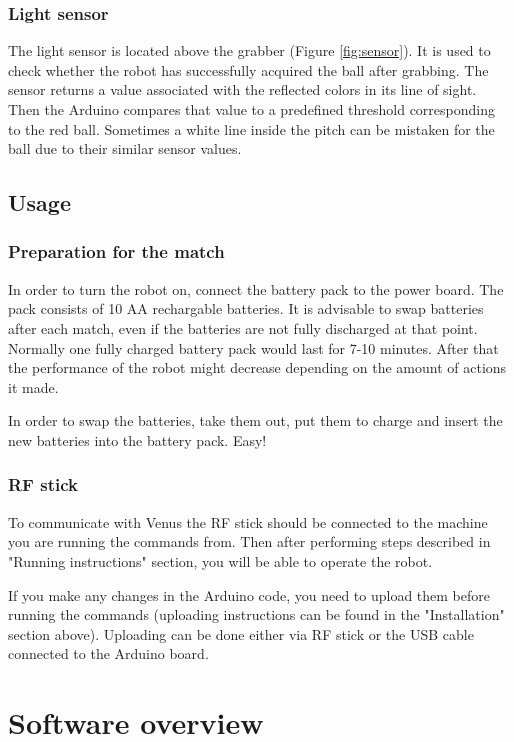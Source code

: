 \documentclass[a4paper,12pt]{article}
\begin{document}
\subsubsection{Light sensor}

The light sensor is located above the grabber (Figure \ref{fig:sensor}). It is used to check whether
the robot has successfully acquired the ball after grabbing. The sensor
returns a value associated with the reflected colors in its line of sight. Then the Arduino compares that value to a predefined threshold corresponding to the red ball. Sometimes a white
line inside the pitch can be mistaken for the ball due to their similar sensor
values.

\subsection{Usage}

\subsubsection{Preparation for the match}

In order to turn the robot on, connect the battery pack to the power board. The pack consists of 10 AA rechargable batteries. It is advisable to swap batteries after each match, even if the batteries are not fully discharged at that point. Normally one fully charged battery pack would last for 7-10 minutes. After that the performance of the robot might decrease depending on the amount of actions it made. 

In order to swap the batteries, take them out, put them to charge and insert the new batteries into the battery pack. Easy!

\subsubsection{RF stick}
To communicate with Venus the RF stick should be connected to the machine you are running the commands from. Then after performing steps described in "Running instructions" section, you will be able to operate the robot.

If you make any changes in the Arduino code, you need to upload them before running the commands (uploading instructions can be found in the "Installation" section above). Uploading can be done either via RF stick or the USB cable connected to the Arduino board. 

\section{Software overview}
\end{document}
